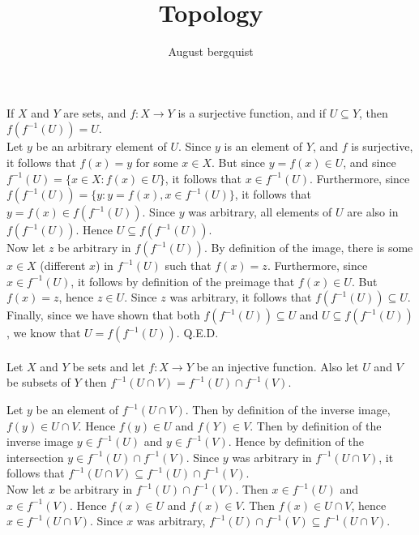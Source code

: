 \documentclass{article}
\title{Topology}
\author{August bergquist}
\newcommand{\inv}[1]{#1^{-1}}
\newcommand{\inv}[1]{#1^{-1}}
\begin{document}
\maketitle

 If $X$ and $Y$ are sets, and $f:X\rightarrow Y$ is a surjective function, and if $U\subseteq Y$, then $f(\inv{f}(U)) = U$.\\

 Let $y$ be an arbitrary element of $U$. Since $y$ is an element of $Y$, and $f$ is surjective, it follows that $f(x) = y$ for some $x\in X$. But since $y = f(x)\in U$, and since $\inv{f}(U) = \{x\in X: f(x) \in U\}$, it follows that $x\in \inv{f}(U)$. Furthermore, since $f(\inv{f}(U)) = \{y : y = f(x), x\in \inv{f}(U)\}$, it follows that $y = f(x)\in f(\inv{f}(U))$. Since $y$ was arbitrary, all elements of $U$ are also in $f(\inv{f}(U))$. Hence $U\subseteq f(\inv{f}(U))$.\\

Now let $z$ be arbitrary in $f(\inv{f}(U))$. By definition of the image, there is some $x\in X$ (different $x$) in $\inv{f}(U)$ such that $f(x) = z$. Furthermore, since $ x\in \inv{f}(U)$, it follows by definition of the preimage that $f(x) \in U$. But $f(x) = z$, hence $z\in U$. Since $z$ was arbitrary, it follows that $f(\inv{f}(U))\subseteq U$.\\

Finally, since we have shown that both $f(\inv{f}(U))\subseteq U $ and $U\subseteq f(\inv{f}(U))$, we know that $U= f(\inv{f}(U))$. Q.E.D.\\
\\


 Let $X$ and $Y$ be sets and let $f:X\rightarrow Y$ be an injective function. Also let $U$ and $V$ be subsets of $Y$ then $\inv{f}(U\cap V) = \inv{f}(U)\cap \inv{f}(V)$.

 Let $y$ be an element of $\inv{f}(U\cap V) $. Then by definition of the inverse image, $f(y)\in U\cap V$. Hence $f(y)\in U$ and $f(Y)\in V$. Then by definition of the inverse image $y\in \inv{f}(U)$ and $y\in \inv{f}(V)$. Hence by definition of the intersection $y\in \inv{f}(U)\cap \inv{f}(V)$. Since $y$ was arbitrary in $\inv{f}(U\cap V)$, it follows that $\inv{f}(U\cap V) \subseteq  \inv{f}(U)\cap \inv{f}(V)$.\\

Now let $x$ be arbitrary in $\inv{f}(U)\cap \inv{f}(V)$. Then $x\in \inv{f}(U)$ and $ x\in \inv{f}(V)$. Hence $f(x)\in U$ and $f(x)\in V$. Then $f(x)\in U \cap V$, hence $x\in \inv{f}(U\cap V)$. Since $x$ was arbitrary, $\inv{f}(U)\cap \inv{f}(V) \subseteq \inv{f}(U\cap V)$.\\
\end{document}

